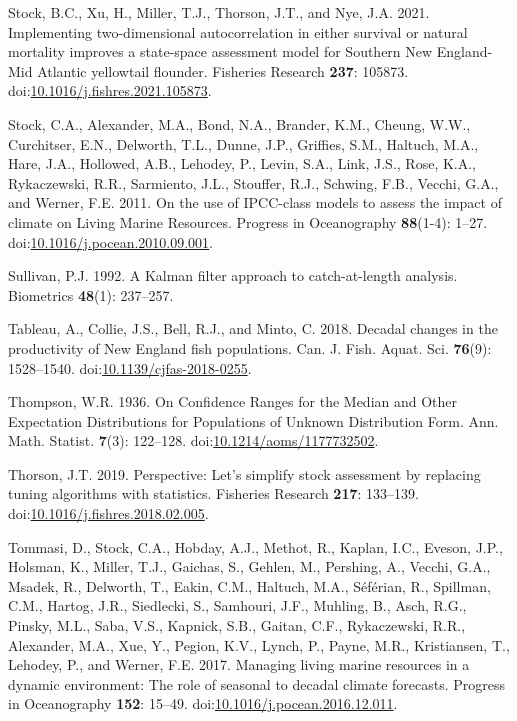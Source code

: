 \documentclass[]{article}
\begin{document}
\leavevmode\hypertarget{ref-stock2021Implementing}{}%
Stock, B.C., Xu, H., Miller, T.J., Thorson, J.T., and Nye, J.A. 2021.
Implementing two-dimensional autocorrelation in either survival or
natural mortality improves a state-space assessment model for Southern
New England-Mid Atlantic yellowtail flounder. Fisheries Research
\textbf{237}: 105873.
doi:\href{https://doi.org/10.1016/j.fishres.2021.105873}{10.1016/j.fishres.2021.105873}.

\leavevmode\hypertarget{ref-stock2011Use}{}%
Stock, C.A., Alexander, M.A., Bond, N.A., Brander, K.M., Cheung, W.W.,
Curchitser, E.N., Delworth, T.L., Dunne, J.P., Griffies, S.M., Haltuch,
M.A., Hare, J.A., Hollowed, A.B., Lehodey, P., Levin, S.A., Link, J.S.,
Rose, K.A., Rykaczewski, R.R., Sarmiento, J.L., Stouffer, R.J., Schwing,
F.B., Vecchi, G.A., and Werner, F.E. 2011. On the use of IPCC-class
models to assess the impact of climate on Living Marine Resources.
Progress in Oceanography \textbf{88}(1-4): 1--27.
doi:\href{https://doi.org/10.1016/j.pocean.2010.09.001}{10.1016/j.pocean.2010.09.001}.

\leavevmode\hypertarget{ref-sullivan1992Kalman}{}%
Sullivan, P.J. 1992. A Kalman filter approach to catch-at-length
analysis. Biometrics \textbf{48}(1): 237--257.

\leavevmode\hypertarget{ref-tableau2018Decadal}{}%
Tableau, A., Collie, J.S., Bell, R.J., and Minto, C. 2018. Decadal
changes in the productivity of New England fish populations. Can. J.
Fish. Aquat. Sci. \textbf{76}(9): 1528--1540.
doi:\href{https://doi.org/10.1139/cjfas-2018-0255}{10.1139/cjfas-2018-0255}.

\leavevmode\hypertarget{ref-thompson1936Confidence}{}%
Thompson, W.R. 1936. On Confidence Ranges for the Median and Other
Expectation Distributions for Populations of Unknown Distribution Form.
Ann. Math. Statist. \textbf{7}(3): 122--128.
doi:\href{https://doi.org/10.1214/aoms/1177732502}{10.1214/aoms/1177732502}.

\leavevmode\hypertarget{ref-thorson2019Perspective}{}%
Thorson, J.T. 2019. Perspective: Let's simplify stock assessment by
replacing tuning algorithms with statistics. Fisheries Research
\textbf{217}: 133--139.
doi:\href{https://doi.org/10.1016/j.fishres.2018.02.005}{10.1016/j.fishres.2018.02.005}.

\leavevmode\hypertarget{ref-tommasi2017Managing}{}%
Tommasi, D., Stock, C.A., Hobday, A.J., Methot, R., Kaplan, I.C.,
Eveson, J.P., Holsman, K., Miller, T.J., Gaichas, S., Gehlen, M.,
Pershing, A., Vecchi, G.A., Msadek, R., Delworth, T., Eakin, C.M.,
Haltuch, M.A., Séférian, R., Spillman, C.M., Hartog, J.R., Siedlecki,
S., Samhouri, J.F., Muhling, B., Asch, R.G., Pinsky, M.L., Saba, V.S.,
Kapnick, S.B., Gaitan, C.F., Rykaczewski, R.R., Alexander, M.A., Xue,
Y., Pegion, K.V., Lynch, P., Payne, M.R., Kristiansen, T., Lehodey, P.,
and Werner, F.E. 2017. Managing living marine resources in a dynamic
environment: The role of seasonal to decadal climate forecasts. Progress
in Oceanography \textbf{152}: 15--49.
doi:\href{https://doi.org/10.1016/j.pocean.2016.12.011}{10.1016/j.pocean.2016.12.011}.
\end{document}

